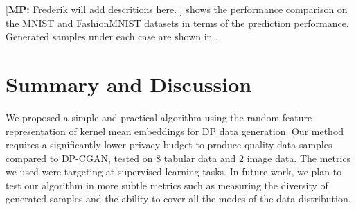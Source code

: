 \documentclass{article}
\newcommand{\mpsay}[1]{[\textbf{MP:} \textcolor{red!60!black}{#1}]}
\begin{document}
\mpsay{Frederik will add descritions here. }
 shows the performance comparison on the MNIST and FashionMNIST datasets in terms of the prediction performance. Generated samples under each case are shown in . 

\newpage 

\section{Summary and Discussion}
We proposed a simple and practical algorithm using the random feature representation of kernel mean embeddings for DP data generation. Our method requires a significantly lower privacy budget to produce quality data samples compared to DP-CGAN, tested on $8$ tabular data and $2$ image data. The metrics we used were targeting at supervised learning tasks. In future work, we plan to test our algorithm in more subtle metrics such as measuring the diversity of generated samples and the ability to cover all the modes of the data distribution.  



%     

\end{document}
